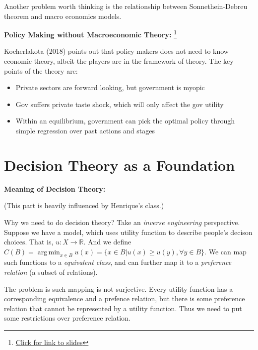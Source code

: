 \documentclass{book}
\theoremstyle{plain}
\theoremstyle{definition}
\newcommand{\R}{\mathbb{R}}			%
\DeclareMathOperator*{\argmin}{arg\,min}
\begin{document}
Another problem worth thinking is the relationship between Sonnethein-Debreu theorem and macro economics models.


\vspace{2em}
\noindent
\textbf{Policy Making without Macroeconomic Theory:}
\footnote{\href{https://docs.google.com/viewer?a=v&pid=sites&srcid=ZGVmYXVsdGRvbWFpbnxrb2NoZXJsYWtvdGEwMDl8Z3g6NDhhODQ0MTI1MWMyNDRjNQ}{Click for link to slides}}


Kocherlakota (2018) points out that policy makers does not need to know economic theory, albeit the players are in the framework of theory.
The key points of the theory are:
\begin{itemize}
	\item Private sectors are forward looking, but government is myopic
	\item Gov suffers private taste shock, which will only affect the gov utility
	\item Within an equilibrium, government can pick the optimal policy through simple regression over past actions and stages
\end{itemize}



\chapter{Decision Theory as a Foundation} %
\label{cha:decision_theory_as_a_foundation}



\vspace{3mm}
\noindent
\textbf{Meaning of Decision Theory:}

(This part is heavily influenced by Henrique's class.)

Why we need to do decision theory?
Take an \textit{inverse engineering} perspective.
Suppose we have a model, which uses utility function to describe people's decison choices. 
That is, $u:X \rightarrow \R$.
And we define $C(B)=\argmin_{x\in B} u(x)=
\{x\in B | u(x)\geq u(y),\forall y\in B\}$.
We can map such functions to a \textit{equivalent class}, and can further map it to a \textit{preference relation} (a subset of relations).

The problem is such mapping is not surjective.
Every utility function has a corresponding equivalence and a prefence relation,
but there is some preference relation that cannot be represented by a utility function.
Thus we need to put some restrictions over preference relation.
\end{document}
